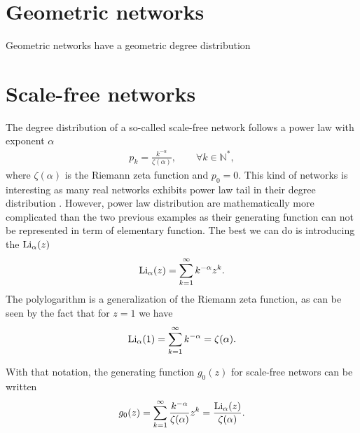 \documentclass[
11pt, %
english, %
singlespacing, %
nolistspacing, %
liststotoc, %
headsepline, %
]{MastersDoctoralThesis} %
\begin{document}
\section{Geometric networks}

Geometric networks have a geometric degree distribution

\section{Scale-free networks}

The degree distribution of a so-called scale-free network follows a power law with exponent $\alpha$
\begin{align}
	p_k = \frac{k^{-\alpha}}{\zeta(\alpha)}, \qquad \forall k \in \mathbb{N}^*, \label{Power law degree distribution}
\end{align}
where $\zeta(\alpha)$ is the Riemann zeta function and $p_0 = 0$. This kind of networks is interesting as many real networks exhibits power law tail in their degree distribution . However, power law distribution are mathematically more complicated than the two previous examples as their generating function can not be represented in term of elementary function. The best we can do is introducing the  $\mathrm{Li}_{\alpha}\!\left(z\right)$
\begin{align}
	\mathrm{Li}_{\alpha}\!\left(z\right) = \sum_{k=1}^\infty k^{-\alpha} z^k. \label{Definition of polylogarithm}
\end{align}
The polylogarithm is a generalization of the Riemann zeta function, as can be seen by the fact that for $z = 1$ we have
\begin{align}
	\mathrm{Li}_{\alpha}\!\left(1\right) = \sum_{k=1}^\infty k^{-\alpha} = \zeta(\alpha) \label{Polylogarithm of 1}.
\end{align}

With that notation, the generating function $g_0(z)$ for scale-free networs can be written
\begin{align}
	g_0(z) = \sum_{k=1}^\infty \frac{k^{-\alpha}}{\zeta(\alpha)} z^k = \frac{\mathrm{Li}_{\alpha}\!\left(z\right)}{\zeta(\alpha)}. \label{Generating function for scale free networks}
\end{align}
\end{document}
